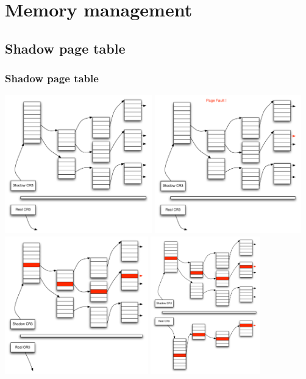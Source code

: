 \section{Memory management}
\subsection{Shadow page table}
\begin{frame}
\frametitle{Shadow page table}
\begin{overlayarea}{10cm}{10cm}
 {\includegraphics[height=6cm]{figures/shadow_page_table_1}}
 {\includegraphics[height=6cm]{figures/shadow_page_table_2}}
 {\includegraphics[height=6cm]{figures/shadow_page_table_3}}
 {\includegraphics[height=6cm]{figures/shadow_page_table_4}}

\end{overlayarea}
\end{frame}
